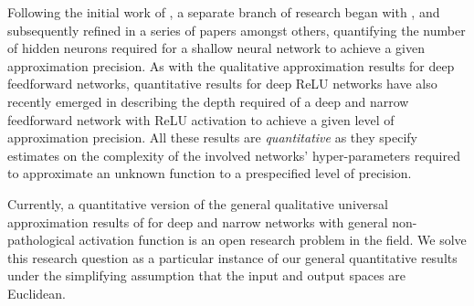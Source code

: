 \documentclass[anon,12pt]{colt2021} %
\begin{document}
Following the initial work of \cite{Cybenko,Hornik}, a separate branch of research began with \cite{Barron}, and subsequently refined in a series of papers \cite{mhaskar1996neural,Petrushev1999,KulsowskiBarrow2018,SIEGEL2020313} amongst others, quantifying the number of hidden neurons required for a shallow neural network to achieve a given approximation precision.  
As with the qualitative approximation results for deep feedforward networks, quantitative results for deep ReLU networks have also recently emerged in \cite{pmlrv75yarotsky18a,QuantitativeDeepReLUSobolev} describing the depth required of a deep and narrow feedforward network with ReLU activation to achieve a given level of approximation precision.  All these results are \textit{quantitative} as they specify estimates on the complexity of the involved networks' hyper-parameters required to approximate an unknown function to a prespecified level of precision.  

Currently, a quantitative version of the general qualitative universal approximation results of \cite{kidger2019universal} for deep and narrow networks with general non-pathological activation function is an open research problem in the field.  We solve this research question as a particular instance of our general quantitative results under the simplifying assumption that the input and output spaces are Euclidean.  


\end{document}

